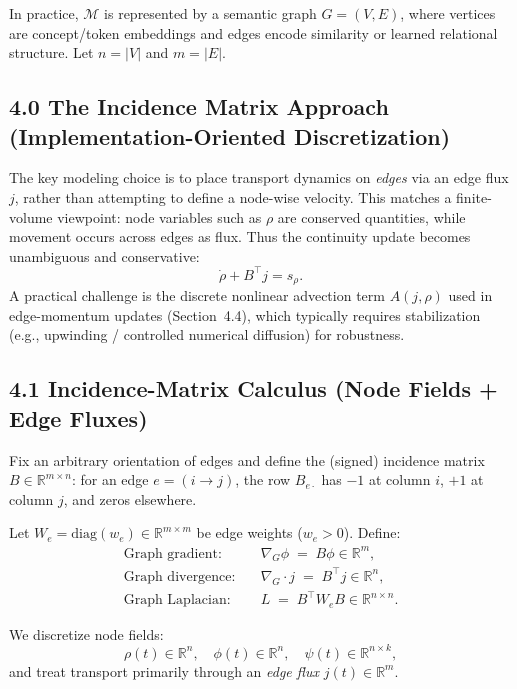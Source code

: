 \documentclass[11pt]{article}
\begin{document}
In practice, $\mathcal{M}$ is represented by a semantic graph $G=(V,E)$, where vertices are concept/token embeddings and edges encode similarity
or learned relational structure. Let $n=|V|$ and $m=|E|$.

\subsection*{4.0 The Incidence Matrix Approach (Implementation-Oriented Discretization)}
The key modeling choice is to place transport dynamics on \emph{edges} via an edge flux $j$, rather than attempting to define a node-wise velocity.
This matches a finite-volume viewpoint: node variables such as $\rho$ are conserved quantities, while movement occurs across edges as flux.
Thus the continuity update becomes unambiguous and conservative:
\begin{equation}
\dot{\rho} + B^\top j = s_\rho.
\end{equation}
A practical challenge is the discrete nonlinear advection term $A(j,\rho)$ used in edge-momentum updates (Section~4.4), which typically requires
stabilization (e.g., upwinding / controlled numerical diffusion) for robustness.

\subsection*{4.1 Incidence-Matrix Calculus (Node Fields + Edge Fluxes)}
Fix an arbitrary orientation of edges and define the (signed) incidence matrix $B\in\mathbb{R}^{m\times n}$:
for an edge $e=(i\to j)$, the row $B_{e\cdot}$ has $-1$ at column $i$, $+1$ at column $j$, and zeros elsewhere.

Let $W_e=\mathrm{diag}(w_e)\in\mathbb{R}^{m\times m}$ be edge weights ($w_e>0$). Define:
\begin{align}
\text{Graph gradient:}\quad & \nabla_G \phi \;=\; B\phi \in\mathbb{R}^m,\\
\text{Graph divergence:}\quad & \nabla_G\cdot j \;=\; B^\top j \in\mathbb{R}^n,\\
\text{Graph Laplacian:}\quad & L \;=\; B^\top W_e B \in\mathbb{R}^{n\times n}.
\end{align}

We discretize node fields:
\begin{equation}
\rho(t)\in\mathbb{R}^n,\quad \phi(t)\in\mathbb{R}^n,\quad \psi(t)\in\mathbb{R}^{n\times k},
\end{equation}
and treat transport primarily through an \emph{edge flux} $j(t)\in\mathbb{R}^m$.
\end{document}
